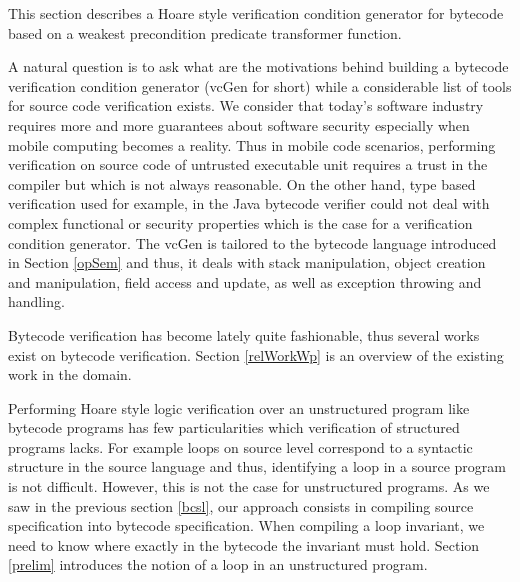 \newtheorem{defLoop}{Definition}[section] 
\newtheorem{defInter}[defLoop]{Definition}
\newtheorem{defExc}[defLoop]{Definition}
\newtheorem{defInv}[defLoop]{Definition}
\newtheorem{defModif}[defLoop]{Definition}

\newtheorem{propPath}{Lemma}[section]

This section describes a Hoare style verification condition generator for bytecode based on a weakest precondition predicate transformer function.
 
A natural question is to ask what are the motivations behind building a bytecode verification condition generator (vcGen for short)
while a considerable list of tools for source code verification exists.
We consider that today's software industry requires more and more guarantees about software security especially when
mobile computing becomes a reality. Thus in mobile code scenarios, performing verification on source code of untrusted executable
 unit requires a trust in the compiler but which is not always reasonable. On the other hand,
 type based verification used for example, in the Java bytecode verifier could not deal with complex functional or security
 properties which is the case for a verification condition generator.   
The vcGen is tailored to the bytecode language introduced in Section \ref{opSem} and thus, it deals
with stack manipulation, object creation and manipulation, field access and update, as well as exception throwing and handling.

Bytecode verification has become lately quite fashionable, thus several works exist on bytecode verification. Section \ref{relWorkWp}
is an overview of the existing work in the domain.



Performing Hoare style logic verification over an unstructured program like bytecode programs has few particularities which
verification of structured programs lacks. For example loops on source level correspond to a syntactic structure in the source language and thus, identifying
a loop in a source program is not difficult.  However, this is not the case for unstructured programs. 
As we saw in the previous section \ref{bcsl}, our approach consists in compiling source specification into
bytecode specification. When compiling a loop invariant, we need to know where exactly in the bytecode the invariant must hold.
Section \ref{prelim} introduces the notion of a loop in an unstructured program.

